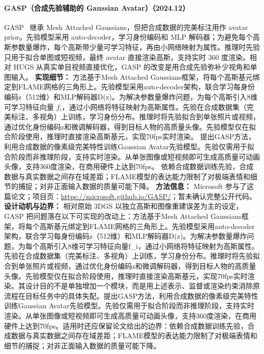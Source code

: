 \paragraph{GASP（合成先验辅助的 Gaussian Avatar）（2024.12）}
GASP~\cite{2412_07739} 继承 Mesh Attached Gaussians，但把合成数据的完美标注用作 avatar prior。先验模型采用 auto-decoder，学习身份编码和 MLP 解码器；为避免每个高斯参数量爆炸，每个高斯带少量可学习特征，再由小网络映射为属性。推理时先验只用于拟合单图或短视频，最终 avatar 直接渲染高斯，支持实时 360 度渲染。相对 HUGS 从真实单目视频直接优化，GASP 的改变是用合成先验弥补少视角和单图输入。
\textbf{实现细节：} 方法基于Mesh Attached Gaussians框架，将每个高斯基元绑定到FLAME网格的三角形上。先验模型采用auto-decoder架构，联合学习每身份编码z（512维）和MLP解码器D(z)。为解决参数量爆炸问题，为每个高斯引入8维可学习特征向量 $f_i$，通过小网络将特征映射为高斯属性。先验在合成数据集（完美标注、多视角）上训练，学习身份分布。推理时将先验拟合到单张照片或视频，通过优化身份编码z和微调解码器，得到目标人物的高质量头像。先验模型仅在拟合阶段使用，推理时直接渲染高斯基元，实现70fps实时渲染。 提出GASP方法，利用合成数据的像素级完美特性训练Gaussian Avatar先验模型。先验仅需用于拟合阶段而非推理阶段，支持实时渲染。从单张图像或短视频即可生成高质量可动画头像，支持360度渲染，在商用硬件上达到70fps。 依赖合成数据训练先验，合成数据与真实数据之间存在域差距；FLAME模型的表达能力限制了对极端表情和细节的捕捉；对非正面输入数据的质量可能下降。
\textbf{方法信息：} Microsoft 参与了这篇论文；项目页：\url{https://microsoft.github.io/GASP/}；暂未确认完整公开代码。
\textbf{设计动机与边界：} 相对原始 3DGS 以独立高斯和图像重建误差为主的设定，GASP 把问题落在以下可实现的改动上：方法基于Mesh Attached Gaussians框架，将每个高斯基元绑定到FLAME网格的三角形上。先验模型采用auto-decoder架构，联合学习每身份编码z（512维）和MLP解码器D(z)。为解决参数量爆炸问题，为每个高斯引入8维可学习特征向量f\_i，通过小网络将特征映射为高斯属性。先验在合成数据集（完美标注、多视角）上训练，学习身份分布。推理时将先验拟合到单张照片或视频，通过优化身份编码z和微调解码器，得到目标人物的高质量头像。先验模型仅在拟合阶段使用，推理时直接渲染高斯基元，实现70fps实时渲染。其设计目的不是单独增加一个模块，而是用上述表示、监督或渲染约束消除原流程在目标任务中的具体失配。提出GASP方法，利用合成数据的像素级完美特性训练Gaussian Avatar先验模型。先验仅需用于拟合阶段而非推理阶段，支持实时渲染。从单张图像或短视频即可生成高质量可动画头像，支持360度渲染，在商用硬件上达到70fps。适用时还应保留论文给出的边界：依赖合成数据训练先验，合成数据与真实数据之间存在域差距；FLAME模型的表达能力限制了对极端表情和细节的捕捉；对非正面输入数据的质量可能下降。
